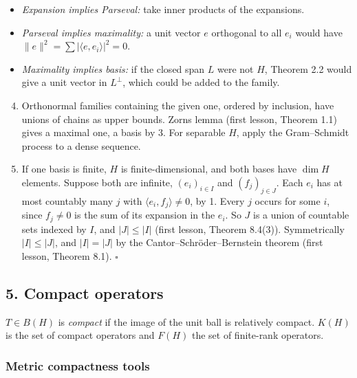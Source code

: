 \documentclass[
  english,
  11pt,
  a4paper,
]{article}
\providecommand{\tightlist}{%
  \setlength{\itemsep}{0pt}\setlength{\parskip}{0pt}}
\begin{document}
\begin{itemize}
\tightlist
\item
  \emph{Expansion implies Parseval:} take inner products of the
  expansions.
\item
  \emph{Parseval implies maximality:} a unit vector \(e\) orthogonal to
  all \(e_i\) would have \(\|e\|^2=\sum|\langle e,e_i\rangle|^2=0\).
\item
  \emph{Maximality implies basis:} if the closed span \(L\) were not
  \(H\), Theorem 2.2 would give a unit vector in \(L^\perp\), which
  could be added to the family.
\end{itemize}

\begin{enumerate}
\setcounter{enumi}{3}
\item
  Orthonormal families containing the given one, ordered by inclusion,
  have unions of chains as upper bounds. Zorn\textquotesingle s lemma
  (first lesson, Theorem 1.1) gives a maximal one, a basis by 3. For
  separable \(H\), apply the Gram--Schmidt process to a dense sequence.
\item
  If one basis is finite, \(H\) is finite-dimensional, and both bases
  have \(\dim H\) elements. Suppose both are infinite,
  \((e_i)_{i\in I}\) and \((f_j)_{j\in J}\). Each \(e_i\) has at most
  countably many \(j\) with \(\langle e_i,f_j\rangle\ne0\), by 1. Every
  \(j\) occurs for some \(i\), since \(f_j\ne0\) is the sum of its
  expansion in the \(e_i\). So \(J\) is a union of countable sets
  indexed by \(I\), and \(|J|\le|I|\) (first lesson, Theorem 8.4(3)).
  Symmetrically \(|I|\le|J|\), and \(|I|=|J|\) by the
  Cantor--Schröder--Bernstein theorem (first lesson, Theorem 8.1).
  \(\square\)
\end{enumerate}

\subsection[5. Compact
operators]{\texorpdfstring{\protect\hypertarget{hilbert-spaces-and-compact-operators--oa-fnd-hs-05}{}{}5.
Compact
operators}{5. Compact operators}}\label{hilbert-spaces-and-compact-operators--OA-FND-HS-05}

\(T\in B(H)\) is \emph{compact} if the image of the unit ball is
relatively compact. \(K(H)\) is the set of compact operators and
\(F(H)\) the set of finite-rank operators.

\subsubsection{Metric compactness
tools}\label{hilbert-spaces-and-compact-operators--metric-compactness-tools}
\end{document}
